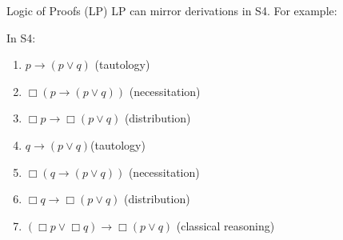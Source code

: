 \documentclass{beamer}
\theoremstyle{definition}
\newcommand{\ou}{\vee}
\newcommand{\impli}{\rightarrow}
\begin{document}
\begin{frame} {Logic of Proofs (LP)}
\qquad LP can mirror derivations in S4. For example:

\vspace{5mm}
In S4:

\begin{enumerate}[1.]

\item $p \impli (p\ou q)$ (tautology)

\item $\Box (p \impli (p\ou q))$ (necessitation)

\item $\Box p \impli \Box(p\ou q)$ (distribution)

\item $q \impli (p\ou q)$(tautology)

\item $\Box (q \impli (p\ou q))$ (necessitation)

\item $\Box q \impli \Box(p\ou q)$ (distribution)

\item $(\Box p \ou \Box q ) \impli \Box(p\ou q)$ (classical reasoning)
\end{enumerate}



\end{frame}
\end{document}
